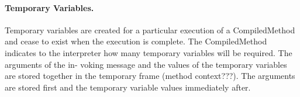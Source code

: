 \documentclass[a4paper,10pt,twoside]{book}
\begin{document}
\paragraph{Temporary Variables.}
Temporary variables are created for a particular execution of a CompiledMethod and cease to exist when the execution is complete. The CompiledMethod indicates to the interpreter how many temporary variables will be required. The arguments of the in- voking message and the values of the temporary variables are stored together in the temporary frame (method context???). The arguments are stored first and the temporary variable values immediately after.
















\ifx\wholebook\relax\else
   
   
\end{document}
